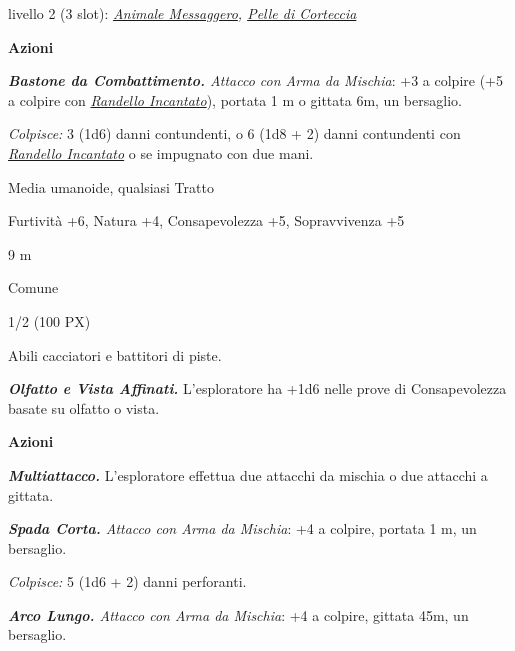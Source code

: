 \begin{multicols}{2}
{livello 2 (3 slot): \emph{\hyperlink{Animale Messaggero}{Animale Messaggero}, \hyperlink{Pelle di Corteccia}{Pelle di Corteccia}}

\textbf{Azioni}

\emph{\textbf{Bastone da Combattimento.} Attacco con Arma da Mischia}: +3 a colpire (+5 a colpire con \emph{\hyperlink{Randello Incantato}{Randello Incantato}}), portata 1 m o gittata 6m, un bersaglio.

\emph{Colpisce:} 3 (1d6) danni contundenti, o 6 (1d8 + 2) danni contundenti con \emph{\hyperlink{Randello Incantato}{Randello Incantato}} o se impugnato con due mani.

\begin{description}[noitemsep, topsep=0pt, parsep=0pt, partopsep=0pt, itemsep=1pt, leftmargin=2.35cm,  labelwidth=2.2cm, itemindent=0cm, listparindent=0pt] %
\setlength{\baselineskip}{10pt}
\item[\textbf{Taglia/Tipo}] Media umanoide, qualsiasi Tratto
\item[\textbf{Caratt.}] 
\item[\textbf{Punti Ferita}] 
\item[\textbf{Comp.}] Furtività +6, Natura +4, Consapevolezza +5, Sopravvivenza +5
\item[\textbf{Tiri Salvez.}] 
\item[\textbf{Movimento}] 9 m
\item[\textbf{Linguaggi}] Comune
\item[\textbf{Sfida}] 1/2 (100 PX)
\end{description}
\smallskip

Abili cacciatori e battitori di piste.

\emph{\textbf{Olfatto e Vista Affinati.}} L'esploratore ha +1d6 nelle prove di Consapevolezza basate su olfatto o vista.

\textbf{Azioni}

\emph{\textbf{Multiattacco.}} L'esploratore effettua due attacchi da mischia o due attacchi a gittata.

\emph{\textbf{Spada Corta.} Attacco con Arma da Mischia}: +4 a colpire, portata 1 m, un bersaglio.

\emph{Colpisce:} 5 (1d6 + 2) danni perforanti.

\emph{\textbf{Arco Lungo.} Attacco con Arma da Mischia}: +4 a colpire, gittata 45m, un bersaglio.

}
\end{multicols}
